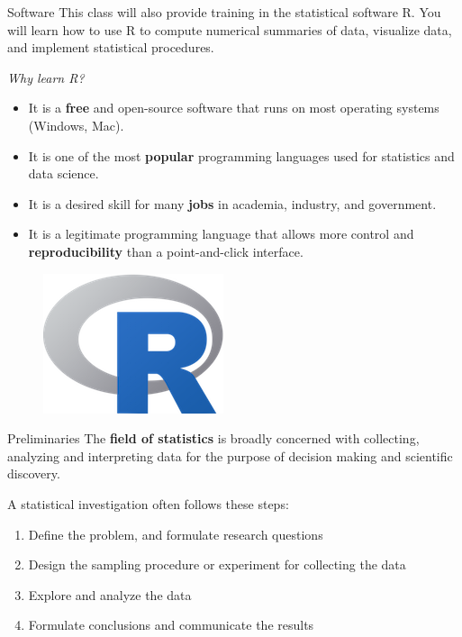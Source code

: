 \documentclass[10pt]{beamer}
\begin{document}
\begin{frame}{Software}
This class will also provide training in the statistical software R.  You will learn how to use R to compute numerical summaries of data, visualize data, and implement statistical procedures.
\vspace{10pt}

\emph{Why learn R?}
\begin{itemize}
\item It is a \textbf{free} and open-source software that runs on most operating systems (Windows, Mac).  
\item It is one of the most \textbf{popular} programming languages used for statistics and data science.  
\item It is a desired skill for many \textbf{jobs} in academia, industry, and government.
\item It is a legitimate programming language that allows more control and \textbf{reproducibility} than a point-and-click interface. 
\end{itemize}

\begin{figure}
\flushright
\includegraphics[scale=0.2]{figure/Rlogo.png}
\end{figure}

\end{frame}

\begin{frame}{Preliminaries}
The \textbf{field of statistics} is broadly concerned with collecting, analyzing and interpreting data for the purpose of decision making and scientific discovery.
\vspace{15pt}

A statistical investigation often follows these steps:
\begin{enumerate}
\item Define the problem, and formulate research questions
\item Design the sampling procedure or experiment for collecting the data
\item Explore and analyze the data  
\item Formulate conclusions and communicate the results\\
\end{enumerate}
\end{frame}
\end{document}
